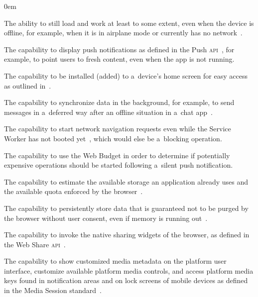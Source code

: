 \documentclass[sigconf]{acmart}
\begin{document}
\begin{description}
  \itemsep0em 
  \item[Offline Capabilities] The ability to still load and work
    at least to some extent, even when the device is offline, for example,
    when it is in airplane mode or currently has no network~\cite{russell2017serviceworkers}.
  \item[Push Notifications] The capability to display push notifications as defined in
    the Push \textsc{api}~\cite{beverloo2017pushapi}, for example,
    to point users to fresh content, even when the app is not running.
  \item[Add to Home Screen] The capability to be installed (added) to a~device's home screen
    for easy access as outlined in~\cite{kinlan2017a2hs}.
  \item[Background Sync] The capability to synchronize data in the background,
    for example, to send messages in a~deferred way
    after an offline situation in a~chat app~\cite{russell2017serviceworkers}.
  \item[Navigation Preload] The capability to start network navigation requests
    even while the Service Worker has not booted yet~\cite{archibald2017navigationpreload},
    which would else be a~blocking operation.
  \item[Silent Push] The capability to use the Web Budget \cite{beverloo2017budgetapi}
    in order to determine if potentially expensive operations should be started
    following a~silent push notification.
  \item[Storage Estimation] The capability to estimate the available storage
    an application already uses and the available quota enforced by the
    browser~\cite{vankesteren2018storage}.
  \item[Persistent Storage] The capability to persistently store data
    that is guaranteed not to be purged by the browser without user consent,
    even if memory is running out~\cite{vankesteren2018storage}.
  \item[Web Share] The capability to invoke the native sharing widgets
    of the browser, as defined in the Web Share \textsc{api}~\cite{giuca2017webshare}.
  \item[Media Session] The capability to show customized media metadata
    on the platform user interface, customize available platform media controls,
    and access platform media keys found in notification areas
    and on lock screens of mobile devices
    as defined in the Media Session standard~\cite{lamouri2017mediasessionapi}.

\end{description}
\end{document}
